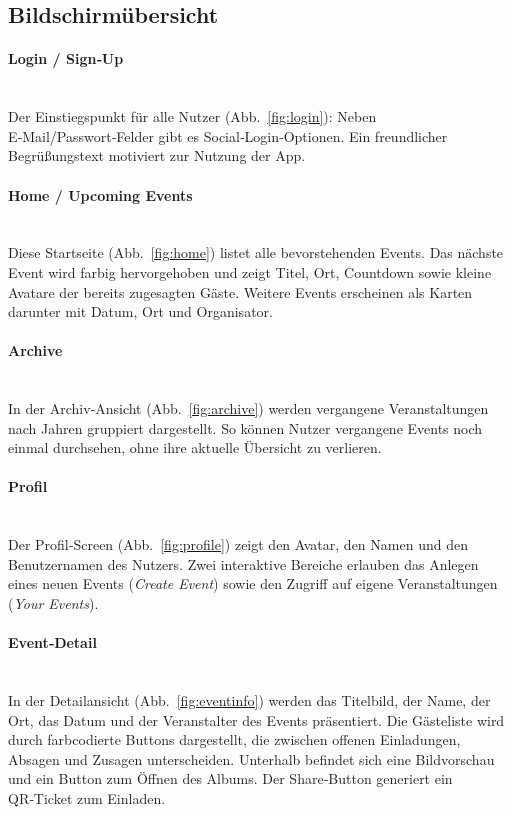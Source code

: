 \documentclass[11pt,a4paper]{article}
\begin{document}
\subsection*{Bildschirmübersicht}

\paragraph{Login / Sign‑Up}\mbox{}\\
Der Einstiegspunkt für alle Nutzer (Abb.~\ref{fig:login}): Neben E‑Mail/Passwort‑Felder gibt es Social‑Login‑Optionen. Ein freundlicher Begrüßungstext motiviert zur Nutzung der App.

\paragraph{Home / Upcoming Events}\mbox{}\\
Diese Startseite (Abb.~\ref{fig:home}) listet alle bevorstehenden Events. Das nächste Event wird farbig hervorgehoben und zeigt Titel, Ort, Countdown sowie kleine Avatare der bereits zugesagten Gäste. Weitere Events erscheinen als Karten darunter mit Datum, Ort und Organisator.

\paragraph{Archive}\mbox{}\\
In der Archiv‑Ansicht (Abb.~\ref{fig:archive}) werden vergangene Veranstaltungen nach Jahren gruppiert dargestellt. So können Nutzer vergangene Events noch einmal durchsehen, ohne ihre aktuelle Übersicht zu verlieren.

\paragraph{Profil}\mbox{}\\
Der Profil‑Screen (Abb.~\ref{fig:profile}) zeigt den Avatar, den Namen und den Benutzernamen des Nutzers. Zwei interaktive Bereiche erlauben das Anlegen eines neuen Events (\emph{Create Event}) sowie den Zugriff auf eigene Veranstaltungen (\emph{Your Events}).

\paragraph{Event‑Detail}\mbox{}\\
In der Detailansicht (Abb.~\ref{fig:eventinfo}) werden das Titelbild, der Name, der Ort, das Datum und der Veranstalter des Events präsentiert. Die Gästeliste wird durch farbcodierte Buttons dargestellt, die zwischen offenen Einladungen, Absagen und Zusagen unterscheiden. Unterhalb befindet sich eine Bildvorschau und ein Button zum Öffnen des Albums. Der Share‑Button generiert ein QR‑Ticket zum Einladen.
\end{document}
